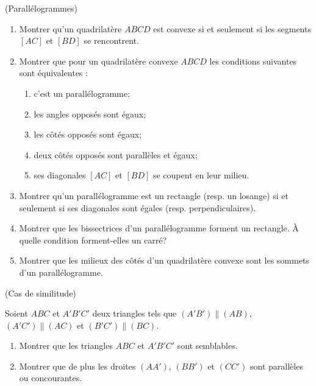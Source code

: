 \documentclass[a4paper,11pt,reqno]{amsart}
\begin{document}
\begin{exo} (Parallélogrammes) %

  \begin{enumerate}
    \item Montrer qu'un quadrilatère $ABCD$ est convexe si et seulement si les segments $[AC]$ et $[BD]$ se rencontrent.
    \item Montrer que pour un quadrilatère convexe $ABCD$ les conditions suivantes sont équivalentes :
    \begin{enumerate}
      \item c'est un parallélogramme;
      \item les angles opposés sont égaux;
      \item les côtés opposés sont égaux;
      \item deux côtés opposés sont parallèles et égaux;
      \item ses diagonales $[AC]$ et $[BD]$ se coupent en leur milieu.
    \end{enumerate}
    \item Montrer qu'un parallélogramme est un rectangle (resp. un losange) si et seulement si ses diagonales sont égales (resp. perpendiculaires).
    \item Montrer que les bissectrices d'un parallélogramme forment un rectangle. À quelle condition forment-elles un carré?
    \item Montrer que les milieux des côtés d'un quadrilatère convexe sont les sommets d'un parallélogramme.
  \end{enumerate}
\end{exo}


\begin{exo} (Cas de similitude)

  Soient $ABC$ et $A'B'C'$ deux triangles tels que $(A'B') \parallel (AB)$, $(A'C') \parallel (AC)$ et $(B'C') \parallel (BC)$.
  \begin{enumerate}
    \item Montrer que les triangles $ABC$ et $A'B'C'$ sont semblables.
    \item Montrer que de plus les droites $(AA')$, $(BB')$ et $(CC')$ sont parallèles ou concourantes.
  \end{enumerate}

\end{exo}
\end{document}
